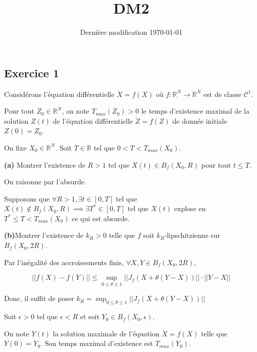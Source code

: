 \documentclass[french]{article}
\begin{document}
	\title{DM2}
	\date{Dernière modification \today}
	
	\maketitle
	
	\subsection*{Exercice 1}
	
	\begin{tcolorbox}[colback=red!5!white,colframe=red!75!black]
		Considérons l'équation différentielle $\dot{X} = f(X)$ où $f : \mathbb{R}^N \to \mathbb{R}^N$ est de classe $\mathcal{C}^1$.
		
		Pour tout $Z_0 \in \mathbb{R}^N$, on note $T_{max}(Z_0) > 0$ le temps d'existence maximal de la solution $Z(t)$ de l'équation différentielle $\dot{Z} = f(Z)$ de donnée initiale $Z(0) = Z_0$.
		
		On fixe $X_0 \in \mathbb{R}^N$. Soit $T \in \mathbb{R}$ tel que $0 < T < T_{max}(X_0)$.
	\end{tcolorbox}
	
	\begin{tcolorbox}[colback=gray!5!white,colframe=gray!75!black]
		\textbf{\large{(a)}} Montrer l'existence de $R > 1$ tel que $X(t) \in B_f(X_0, R)$ pour tout $t \leq T$.  
	\end{tcolorbox}

	On raisonne par l'absurde.
	
	Supposons que $ \forall R > 1, \exists t \in [0, T]$ tel que $X(t) \not\in B_f(X_0, R) \implies \exists T^* \in [0, T]$ tel que $X(t)$ explose en $T^* \leq T < T_{max}(X_0)$ ce qui est absurde.

	\begin{tcolorbox}[colback=gray!5!white,colframe=gray!75!black]
		\textbf{\large{(b)}}Montrer l'existence de $k_R > 0$ telle que $f$ soit $k_R$-lipschitzienne sur $B_f(X_0, 2R)$. 
	\end{tcolorbox}

	Par l'inégalité des accroissements finis, $\forall X,Y \in B_f(X_0, 2R)$,
	
	\[|| f(X) - f(Y)|| \leq \sup_{0\leq \theta \leq 1} || J_f(X + \theta(Y - X)) || \cdot ||Y - X||\]
	
	Donc, il suffit de poser $k_R = \sup_{0\leq \theta \leq 1} || J_f(X + \theta(Y - X)) ||$

	\begin{tcolorbox}[colback=red!5!white,colframe=red!75!black]
		Soit $\epsilon > 0$ tel que $\epsilon < R$ et soit $Y_0 \in B_f(X_0, \epsilon)$.
		
		On note $Y(t)$ la solution maximale de l'équation $\dot{X} = f(X)$ telle que $Y(0) = Y_0$. Son temps maximal d'existence est $T_{max}(Y_0)$.
	\end{tcolorbox}
\end{document}
